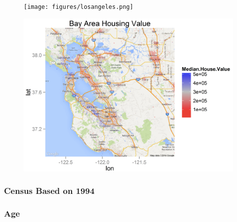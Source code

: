 \documentclass{beamer}
\begin{document}
\begin{frame}
	\begin{figure}
 \texttt{[image: figures/losangeles.png]}
\end{figure}
\end{frame}

\begin{frame}
	\begin{figure}
 \includegraphics[scale=0.3]{figures/bayarea.png}
\end{figure}
\end{frame}


\author[Olga Prilepova]{C. Patton, A. Rumbaugh, T. Provan, O. Prilepova, J. Chen}

\begin{frame}
\frametitle{Census Based on 1994}
\end{frame}

\begin{frame}
\frametitle{Age}
\end{frame}
\end{document}
